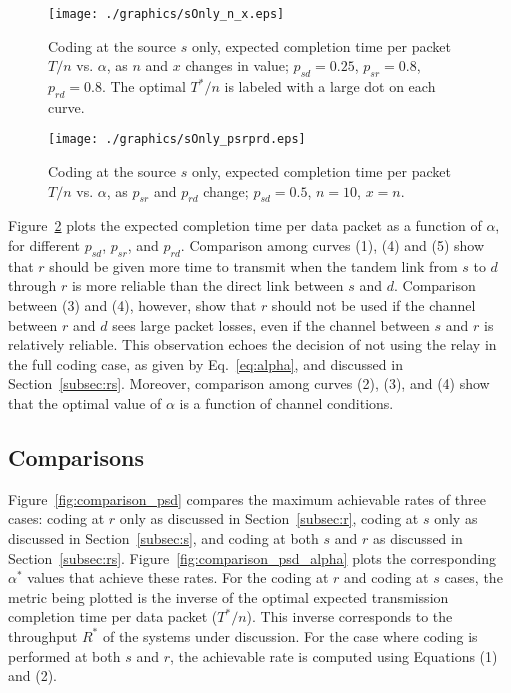 \documentclass[journal, letterpaper]{IEEEtran}
\begin{document}
\begin{figure}[t!]
\centering
  \texttt{[image: ./graphics/sOnly\_n\_x.eps]}
  \caption{Coding at the source $s$ only, expected completion time per packet $T/n$  vs. $\alpha$, as $n$ and $x$ changes in value; $p_{sd} = 0.25$, $p_{sr}=0.8$, $p_{rd} =0.8$. The optimal $T^*/n$ is labeled with a large dot on each curve.}
  \label{fig:sOnly_n}
\end{figure}
\begin{figure}[t!]
\centering
  \texttt{[image: ./graphics/sOnly\_psrprd.eps]}
  \caption{Coding at the source $s$ only, expected completion time per packet $T/n$ vs. $\alpha$, as $p_{sr}$ and $p_{rd}$ change; $p_{sd} = 0.5$, $n=10$, $x=n$.}
  \label{fig:sOnly_psrprd}
\end{figure}

Figure~\ref{fig:sOnly_psrprd} plots the expected completion time per data packet as a function of $\alpha$, for different $p_{sd}$, $p_{sr}$, and $p_{rd}$. Comparison among curves (1), (4) and (5) show that $r$ should be given more time to transmit when the tandem link from $s$ to $d$ through $r$ is more reliable than the direct link between $s$ and $d$. Comparison between (3) and (4), however, show that $r$ should not be used if the channel between $r$ and $d$ sees large packet losses, even if the channel between $s$ and $r$ is relatively reliable. This observation echoes the decision of not using the relay in the full coding case, as given by Eq.~\eqref{eq:alpha}, and discussed in Section~\ref{subsec:rs}. Moreover, comparison among curves (2), (3), and (4) show that the optimal value of $\alpha$ is a function of channel conditions.

\subsection{Comparisons}\label{subsec:comparison}

Figure~\ref{fig:comparison_psd} compares the maximum achievable rates of three cases: coding at $r$ only as discussed in Section~\ref{subsec:r}, coding at $s$ only as discussed in Section~\ref{subsec:s}, and coding at both $s$ and $r$ as discussed in Section~\ref{subsec:rs}. Figure~\ref{fig:comparison_psd_alpha} plots the corresponding $\alpha^*$ values that achieve these rates. For the coding at $r$ and coding at $s$ cases, the metric being plotted is the inverse of the optimal expected transmission completion time per data packet ($T^*/n$). This inverse corresponds to the throughput $R^*$ of the systems under discussion. For the case where coding is performed at both $s$ and $r$, the achievable rate is computed using Equations (1) and (2).
\end{document}
